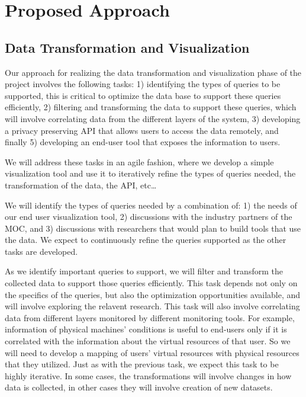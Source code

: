 \section{Proposed Approach}
\label{sec:ProposedApproach}



\subsection{Data Transformation and Visualization}
  
Our approach for realizing the data transformation and visualization phase of the project involves the following tasks: 1) identifying the types of queries to be supported, this is critical to optimize the data base to support these queries efficiently, 2) filtering and transforming the data to support these queries, which will involve correlating data from the different layers of the system, 3) developing a privacy preserving API that allows users to access the data remotely, and finally 5) developing an end-user tool that exposes the information to users.  

We will address these tasks in an agile fashion, where we develop a simple visualization tool and use it to iteratively refine the types of queries needed, the transformation of the data, the API, etc…  

We will identify the types of queries needed by a combination of: 1) the needs of our end user visualization tool, 2) discussions with the industry partners of the MOC, and 3) discussions with researchers that would plan to build tools that use the data.  We expect to continuously refine the queries supported as the other tasks are developed. 

As we identify important queries to support, we will  filter and transform the collected data to support those queries efficiently.  This task depends not only on the specifics of the queries, but also the optimization opportunities available, and will involve exploring the relavent research.   This task will also involve correlating data from different layers monitored by different monitoring tools. For example, information of physical machines’ conditions is useful to end-users only if it is correlated with the information about the virtual resources of that user. So we will need to develop a mapping of users’ virtual resources with physical resources that they utilized.  Just as with the previous task, we expect this task to be highly iterative.  In some cases, the transformations will involve changes in how data is collected, in other cases they will involve creation of new datasets. 

